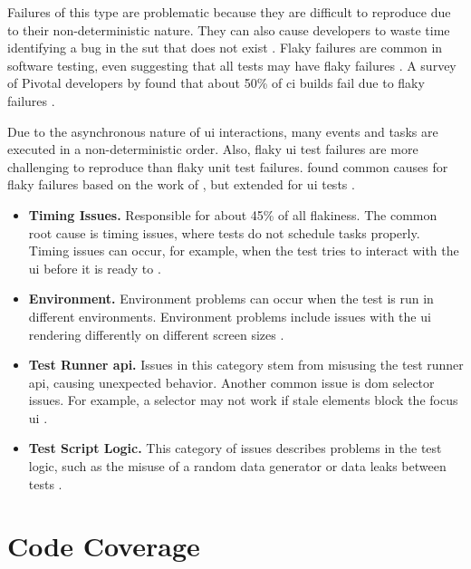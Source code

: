 Failures of this type are problematic because they are difficult to reproduce due to their non-deterministic nature.
They can also cause developers to waste time identifying a bug in the \ac{sut} that does not exist \autocite{ziftci_-flake_2020}.
Flaky failures are common in software testing, \citeauthor*{harman_start-ups_2018} even suggesting that all tests may have flaky failures \autocite{harman_start-ups_2018}.
A survey of Pivotal developers by \citeauthor*{hilton_trade-offs_2017} found that about 50\% of \ac{ci} builds fail due to flaky failures \autocite{hilton_trade-offs_2017}.

Due to the asynchronous nature of \ac{ui} interactions, many events and tasks are executed in a non-deterministic order.
Also, flaky \ac{ui} test failures are more challenging to reproduce than flaky unit test failures.
 found common causes for flaky failures based on the work of \citeauthor*{luo_empirical_2014}, but extended for \ac{ui} tests \autocite{luo_empirical_2014,romano_empirical_2021}.

\begin{itemize}
	\item \textbf{Timing Issues.} Responsible for about 45\% of all flakiness. The common root cause is timing issues, where tests do not schedule tasks properly.
	      Timing issues can occur, for example, when the test tries to interact with the \ac{ui} before it is ready to \autocite{romano_empirical_2021}.
	\item \textbf{Environment.} Environment problems can occur when the test is run in different environments.
	      Environment problems include issues with the \ac{ui} rendering differently on different screen sizes \autocite{romano_empirical_2021}.
	\item \textbf{Test Runner \acs{api}.} Issues in this category stem from misusing the test runner \ac{api}, causing unexpected behavior.
	      Another common issue is \ac{dom} selector issues. For example, a selector may not work if stale elements block the focus \ac{ui} \autocite{romano_empirical_2021}.
	\item \textbf{Test Script Logic.} This category of issues describes problems in the test logic, such as the misuse of a random data generator or data leaks between tests \autocite{romano_empirical_2021}.
\end{itemize}


\section{Code Coverage}

